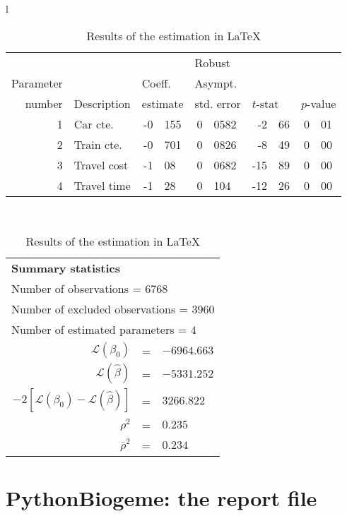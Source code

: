 \documentclass[12pt,a4paper]{article}
\newcommand{\PBIOGEME}{PythonBiogeme}
\begin{document}
\begin{table}[htb]
\footnotesize
  \begin{tabular}{l}
\begin{tabular}{rlr@{.}lr@{.}lr@{.}lr@{.}l}
         &                       &   \multicolumn{2}{l}{}    & \multicolumn{2}{l}{Robust}  &     \multicolumn{4}{l}{}   \\
Parameter &                       &   \multicolumn{2}{l}{Coeff.}      & \multicolumn{2}{l}{Asympt.}  &     \multicolumn{4}{l}{}   \\
number &  Description                     &   \multicolumn{2}{l}{estimate}      & \multicolumn{2}{l}{std. error}  &   \multicolumn{2}{l}{$t$-stat}  &   \multicolumn{2}{l}{$p$-value}   \\

\hline

1 & Car cte. & -0&155 & 0&0582 & -2&66 & 0&01\\
2 & Train cte. & -0&701 & 0&0826 & -8&49 & 0&00\\
3 & Travel cost & -1&08 & 0&0682 & -15&89 & 0&00\\
4 & Travel time & -1&28 & 0&104 & -12&26 & 0&00\\
\hline
\end{tabular}
\\
\begin{tabular}{rcl}
\multicolumn{3}{l}{\bf Summary statistics}\\
\multicolumn{3}{l}{ Number of observations = $6768$} \\
\multicolumn{3}{l}{ Number of excluded observations = $3960$} \\
\multicolumn{3}{l}{ Number of estimated  parameters = $4$} \\
 $\mathcal{L}(\beta_0)$ &=&  $-6964.663$ \\
 $\mathcal{L}(\hat{\beta})$ &=& $-5331.252 $  \\
 $-2[\mathcal{L}(\beta_0) -\mathcal{L}(\hat{\beta})]$ &=& $3266.822$ \\
    $\rho^2$ &=&   $0.235$ \\
    $\bar{\rho}^2$ &=&    $0.234$ \\
\end{tabular}
  \end{tabular}
\caption{\label{tab:latex}Results of the estimation in \LaTeX}
\end{table}


\clearpage
\section{\PBIOGEME: the report file}
\label{sec:pythonreport}
\end{document}

